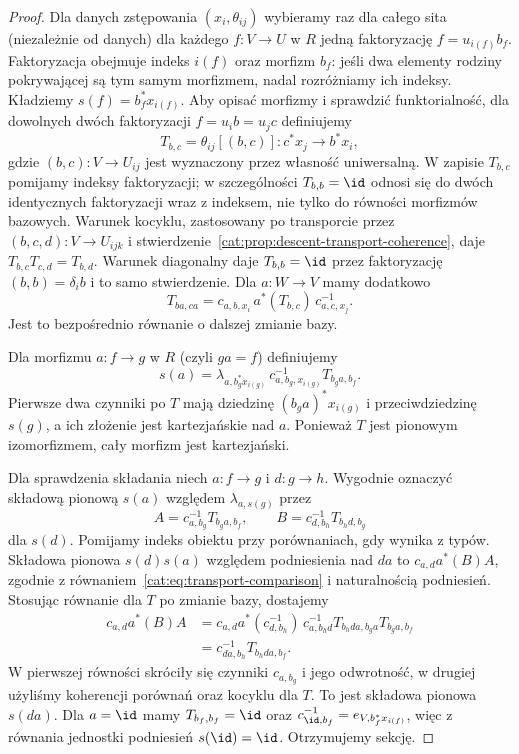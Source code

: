 \begin{proof}
Dla danych zstępowania $(x_i,\theta_{ij})$ wybieramy raz dla całego sita (niezależnie od danych) dla każdego $f:V\to U$ w $R$ jedną faktoryzację $f=u_{i(f)}b_f$. Faktoryzacja obejmuje indeks $i(f)$ oraz morfizm $b_f$: jeśli dwa elementy rodziny pokrywającej są tym samym morfizmem, nadal rozróżniamy ich indeksy. Kładziemy $s(f)=b_f^*x_{i(f)}$. Aby opisać morfizmy i sprawdzić funktorialność, dla dowolnych dwóch faktoryzacji $f=u_i b=u_j c$ definiujemy
\[
 T_{b,c}=\theta_{ij}[(b,c)]:c^*x_j\longrightarrow b^*x_i,
\]
gdzie $(b,c):V\to U_{ij}$ jest wyznaczony przez własność uniwersalną. W zapisie $T_{b,c}$ pomijamy indeksy faktoryzacji; w szczególności $T_{b,b}=\id$ odnosi się do dwóch identycznych faktoryzacji wraz z indeksem, nie tylko do równości morfizmów bazowych. Warunek kocyklu, zastosowany po transporcie przez $(b,c,d):V\to U_{ijk}$ i stwierdzenie~\ref{cat:prop:descent-transport-coherence}, daje $T_{b,c}T_{c,d}=T_{b,d}$. Warunek diagonalny daje $T_{b,b}=\id$ przez faktoryzację $(b,b)=\delta_i b$ i to samo stwierdzenie. Dla $a:W\to V$ mamy dodatkowo
\[
 T_{ba,ca}=c_{a,b,x_i}\,a^*(T_{b,c})\,c_{a,c,x_j}^{-1}.
\]
Jest to bezpośrednio równanie o dalszej zmianie bazy.

Dla morfizmu $a:f\to g$ w $R$ (czyli $ga=f$) definiujemy
\[
 s(a)=\lambda_{a,b_g^*x_{i(g)}}\,
       c_{a,b_g,x_{i(g)}}^{-1} T_{b_ga,b_f}.
\]
Pierwsze dwa czynniki po $T$ mają dziedzinę $(b_ga)^*x_{i(g)}$ i przeciwdziedzinę $s(g)$, a ich złożenie jest kartezjańskie nad $a$. Ponieważ $T$ jest pionowym izomorfizmem, cały morfizm jest kartezjański.

Dla sprawdzenia składania niech $a:f\to g$ i $d:g\to h$. Wygodnie oznaczyć składową pionową $s(a)$ względem $\lambda_{a,s(g)}$ przez
\[
 A=c_{a,b_g}^{-1}T_{b_ga,b_f},\qquad
 B=c_{d,b_h}^{-1}T_{b_hd,b_g}
\]
dla $s(d)$. Pomijamy indeks obiektu przy porównaniach, gdy wynika z typów. Składowa pionowa $s(d)s(a)$ względem podniesienia nad $da$ to $c_{a,d}a^*(B)A$, zgodnie z równaniem~\eqref{cat:eq:transport-comparison} i naturalnością podniesień. Stosując równanie dla $T$ po zmianie bazy, dostajemy
\[
\begin{aligned}
 c_{a,d}a^*(B)A
 &=c_{a,d}a^*(c_{d,b_h}^{-1})\,
   c_{a,b_hd}^{-1}T_{b_hda,b_ga}T_{b_ga,b_f}\\
 &=c_{da,b_h}^{-1}T_{b_hda,b_f}.
\end{aligned}
\]
W pierwszej równości skróciły się czynniki $c_{a,b_g}$ i jego odwrotność, w drugiej użyliśmy koherencji porównań oraz kocyklu dla $T$. To jest składowa pionowa $s(da)$. Dla $a=\id$ mamy $T_{b_f,b_f}=\id$ oraz $c_{\id,b_f}^{-1}=e_{V,b_f^*x_{i(f)}}$, więc z równania jednostki podniesień $s(\id)=\id$. Otrzymujemy sekcję.


\end{proof}
